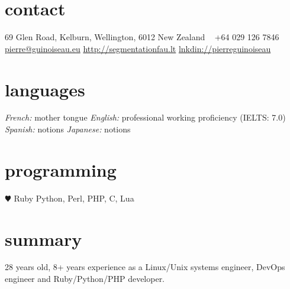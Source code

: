 \documentclass[]{friggeri-cv} %
\begin{document}



\begin{aside} %
\section{contact}
69 Glen Road,
Kelburn,
Wellington, 6012
New Zealand
~
+64 029 126 7846
~
\href{mailto:pierre@guinoiseau.eu}{pierre@guinoiseau.eu}
\href{http://segmentationfau.lt}{http://segmentationfau.lt}
\href{http://linkedin.com/in/pierreguinoiseau}{lnkdin://pierreguinoiseau}
\section{languages}
\textit{French:} mother tongue
\textit{English:} professional working proficiency
(IELTS: 7.0)
\textit{Spanish:} notions
\textit{Japanese:} notions
\section{programming}
{\color{red} $\varheartsuit$} Ruby
Python, Perl, PHP, C, Lua
\end{aside}


\section{summary}

28 years old, 8+ years experience as a Linux/Unix systems engineer, DevOps engineer and Ruby/Python/PHP developer. \\

\end{document}
